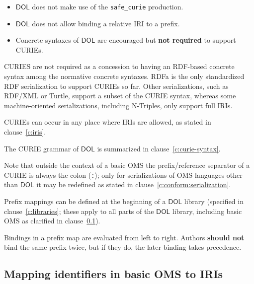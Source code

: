 \documentclass[10pt,fleqn,final]{scrreprt}
\newcommand*{\syntax}[1]{\texttt{#1}}
\newcommand*{\notrequired}{\textbf{not required}\xspace}
\newcommand*{\shouldnot}{\textbf{should not}\xspace}
\newcommand*{\DOL}{\ensuremath{\mathsf{DOL}}\xspace}
\newcommand{\clauserefname}{clause}
\newcommand{\cref}[1]{\clauserefname~\ref{#1}}
\newcommand{\ssclause}[1]{\subsection{#1}}
\newenvironment{definitions}[0]{\medskip }{}
\begin{document}
\begin{definitions}
\begin{itemize}
\item \DOL does not make use of the \syntax{safe\_curie} production.
\item \DOL does not allow binding a relative IRI to a prefix.
\item Concrete syntaxes of \DOL are encouraged but \notrequired to support CURIEs.
\end{itemize}

{CURIES are not required as 
a concession to having an RDF-based concrete syntax among the normative concrete syntaxes.  RDFa is 
the only standardized RDF serialization to support CURIEs so far.  Other serializations, such as 
RDF/XML or Turtle, support a subset of the CURIE syntax, whereas some machine-oriented 
serializations, including N-Triples, only support full IRIs.}

CURIEs can occur in any place where IRIs are allowed, as stated in \cref{c:iris}.

The CURIE grammar of \DOL is summarized in \cref{c:curie-syntax}.


Note that outside the context of a basic OMS the prefix/reference separator of a CURIE is always the colon (\syntax{:}); only for serializations of OMS languages other than \DOL it may be redefined as stated in \cref{c:conform:serialization}.

Prefix mappings can be defined at the beginning of a \DOL library (specified in \cref{c:libraries}; 
these apply to all parts of the \DOL library, including basic OMS as clarified in \cref{c:map-ids}).  

Bindings in a prefix map are evaluated from left to right.  Authors \shouldnot bind the same prefix twice, but if they do, the later binding takes precedence.

\ssclause{Mapping identifiers in basic OMS to IRIs}\label{c:map-ids}


\end{definitions}
\end{document}
